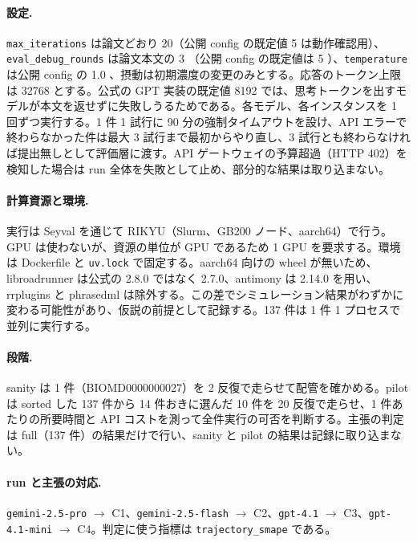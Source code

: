 \documentclass{article}
\begin{document}
\paragraph{設定.}
\texttt{max\_iterations} は論文どおり 20（公開 config の既定値 5 \cite[s2.p2]{h4duan-2025-scigym} は動作確認用）、\texttt{eval\_debug\_rounds} は論文本文の 3 \cite[s1.p4]{duan-2025-measuring}（公開 config の既定値は 5 \cite[s2.p3]{h4duan-2025-scigym}）、\texttt{temperature} は公開 config の 1.0 \cite[s2.p1]{h4duan-2025-scigym}、摂動は初期濃度の変更のみとする。応答のトークン上限は 32768 とする。公式の GPT 実装の既定値 8192 では、思考トークンを出すモデルが本文を返せずに失敗しうるためである。各モデル、各インスタンスを 1 回ずつ実行する。1 件 1 試行に 90 分の強制タイムアウトを設け、API エラーで終わらなかった件は最大 3 試行まで最初からやり直し、3 試行とも終わらなければ提出無しとして評価層に渡す。API ゲートウェイの予算超過（HTTP 402）を検知した場合は run 全体を失敗として止め、部分的な結果は取り込まない。

\paragraph{計算資源と環境.}
実行は Seyval を通じて RIKYU（Slurm、GB200 ノード、aarch64）で行う。GPU は使わないが、資源の単位が GPU であるため 1 GPU を要求する。環境は Dockerfile と \texttt{uv.lock} で固定する。aarch64 向けの wheel が無いため、libroadrunner は公式の 2.8.0 ではなく 2.7.0、antimony は 2.14.0 を用い、rrplugins と phrasedml は除外する。この差でシミュレーション結果がわずかに変わる可能性があり、仮説の前提として記録する。137 件は 1 件 1 プロセスで並列に実行する。

\paragraph{段階.}
sanity は 1 件（BIOMD0000000027）を 2 反復で走らせて配管を確かめる。pilot は sorted した 137 件から 14 件おきに選んだ 10 件を 20 反復で走らせ、1 件あたりの所要時間と API コストを測って全件実行の可否を判断する。主張の判定は full（137 件）の結果だけで行い、sanity と pilot の結果は記録に取り込まない。

\paragraph{run と主張の対応.}
\texttt{gemini-2.5-pro} $\to$ C1、\texttt{gemini-2.5-flash} $\to$ C2、\texttt{gpt-4.1} $\to$ C3、\texttt{gpt-4.1-mini} $\to$ C4。判定に使う指標は \texttt{trajectory\_smape} である。
\end{document}
